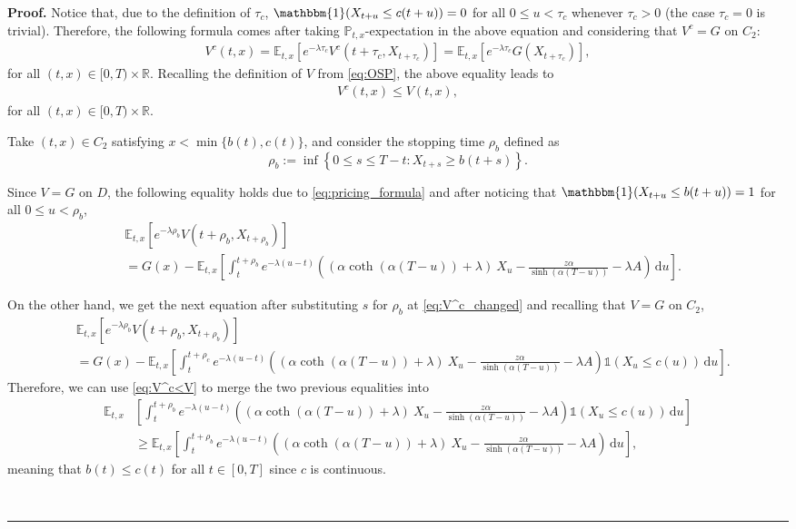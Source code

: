 \documentclass{tufte-handout}
\newenvironment{pf}[1][Proof]{\textbf{#1.} }{\ \rule{0.5em}{0.5em}}
\begin{document}
\begin{pf}
		Notice that, due to the definition of $\tau_{c}$, $\mathbbm{1}(X_{t+u} \leq c(t+u)) = 0$ for all $0\leq u < \tau_{c}$ whenever $\tau_c > 0$ (the case $\tau_c = 0$ is trivial). Therefore, the following formula comes after taking $\mathbb{P}_{t, x}$-expectation in the above equation and considering that $V^c = G$ on $C_2$:
		\begin{align*}
		V^{c}(t,x) = \mathbb{E}_{t, x}[e^{-\lambda\tau_c}V^{c}(t+\tau_{c}, X_{t + \tau_{c}})] = \mathbb{E}_{t,x}\left[e^{-\lambda\tau_c}G(X_{t+\tau_{c}})\right],
		\end{align*} 
		for all $(t,x)\in[0,T)\times\mathbb{R}$. Recalling the definition of $V$ from \eqref{eq:OSP}, the above equality leads to
		\begin{align}\label{eq:V^c<V}
		V^{c}(t,x)\leq V(t,x),
		\end{align}
		for all $(t,x)\in[0,T)\times\mathbb{R}$.
		
		
		Take $(t, x)\in C_{2}$ satisfying $x < \min\{b(t), c(t)\}$, and consider the stopping time $\rho_{b}$ defined as
		$$
		\rho_b := \inf\left\{0 \leq s\leq T - t: X_{t + s} \geq b(t + s)\right\}.
		$$
		
		Since $V = G$ on $D$, the following equality holds due to \eqref{eq:pricing_formula} and after noticing that $\mathbbm{1}(X_{t + u} \leq b(t + u)) = 1$ for all $0\leq u < \rho_b$,
		\begin{align*}
		&\mathbb{E}_{t, x}[e^{-\lambda\rho_b}V(t + \rho_b, X_{t + \rho_b})] \\
		&= G(x) -  \mathbb{E}_{t, x}\left[\int_{t}^{t + \rho_b}e^{-\lambda(u - t)}\left(\left(\alpha\coth(\alpha(T - u)) + \lambda\right)\ X_{u} - \frac{z\alpha}{\sinh(\alpha(T - u))} - \lambda A \right)\,\mathrm{d}u\right].
		\end{align*}
		
		On the other hand, we get the next equation after substituting $s$ for $\rho_b$ at \eqref{eq:V^c_changed}  and recalling that $V = G$ on $C_2$,
		\begin{align*}
		&\mathbb{E}_{t, x}[e^{-\lambda\rho_b}V(t+ \rho_b, X_{t + \rho_b})] 
		\\
		&= G(x) - \mathbb{E}_{t, x}\left[\int_{t}^{t + \rho_{c}}e^{-\lambda(u - t)}\left(\left(\alpha\coth(\alpha(T - u)) + \lambda\right)\ X_{u} - \frac{z\alpha}{\sinh(\alpha(T - u))} - \lambda A \right)\mathbb{1}\left(X_{u}\leq c(u)\right)\,\mathrm{d}u\right].
		\end{align*}
		Therefore, we can use \eqref{eq:V^c<V} to merge the two previous equalities into
		\begin{align*}
		\mathbb{E}_{t,x}&\left[\int_{t}^{t + \rho_b}e^{-\lambda(u - t)}\left(\left(\alpha\coth(\alpha(T - u)) + \lambda\right)\ X_{u} - \frac{z\alpha}{\sinh(\alpha(T - u))} - \lambda A \right)\mathbb{1}\left(X_{u}\leq c(u)\right)\,\mathrm{d}u\right]\\
		&\geq \mathbb{E}_{t, x}\left[\int_{t}^{t + \rho_b}e^{-\lambda(u - t)}\left(\left(\alpha\coth(\alpha(T - u)) + \lambda\right)\ X_{u} - \frac{z\alpha}{\sinh(\alpha(T - u))} - \lambda A \right)\,\mathrm{d}u\right],
		\end{align*}
		meaning that $b(t) \leq c(t)$ for all $t\in[0,T]$ since $c$ is continuous. 
		

\end{pf}
\end{document}
